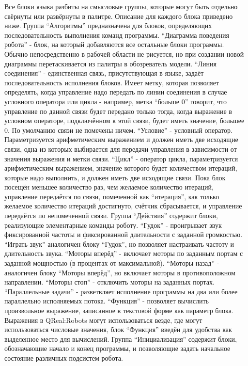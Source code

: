 	Все блоки языка разбиты на смысловые группы, которые могут быть отдельно свёрнуты или развёрнуты в палитре. Описание для каждого блока приведено ниже.
Группа “Алгоритмы” предназначена для блоков, определяющих последовательность выполнения команд программы.
“Диаграмма поведения робота” - блок, на который добавляются все остальные блоки программы. Обычно непосредственно в рабочей области не рисуется, но при создании новой диаграммы перетаскивается из палитры в обозреватель модели.
“Линия соединения” - единственная связь, присутствующая в языке, задаёт последовательность исполнения блоков. Имеет метку, которая позволяет определять, когда управление надо передать по линии соединения в случае условного оператора или цикла - например, метка “больше 0” говорит, что управление по данной связи будет передано только тогда, когда выражение в условном операторе, подключённом к этой связи, будет иметь значение, большее 0. По умолчанию связи не помечены ничем.
“Условие” - условный оператор. Параметризуется арифметическим выражением и должен иметь две исходящие связи, одна из которых выбирается для передачи управления в зависимости от значения выражения и метки связи.
“Цикл” - оператор цикла, параметризуется арифметическим выражением, значение которого будет количеством итераций, которые надо выполнить, и должен иметь две исходящие связи. Пока блок посещён меньшее количество раз, чем желаемое количество итераций, управление передаётся по связи, помеченной как “итерация”, как только желаемое количество итераций достигнуто, счётчик сбрасывается, и управление передаётся по непомеченной связи.
Группа “Действия” содержит блоки, реализующие элементарные команды роботу.
“Гудок” - проигрывает звук фиксированной частоты и фиксированной длительности с заданной громкостью.
“Играть звук” аналогичен блоку “Гудок”, но позволяет настраивать частоту и длительность звука.
“Моторы вперёд” - включает моторы по заданным портам с заданной мощностью (в процентах от максимальной).
“Моторы назад” - аналогичен блоку “Моторы вперёд”, но включает моторы в противоположном направлении.
“Моторы стоп”  - отключить моторы на заданных портах.
“Параллельные задачи” - разветвляет исполнение программы на два или более параллельно исполняемых потока.
“Функция” - позволяет вычислить произвольное выражение, записанное в текстовой форме как параметр блока. Выражения в QReal:Robots могут использоваться везде, где могут использоваться числовые значения, блок “Функция” введён для удобства как выделенное место для вычислений.
Группа “Инициализация” содержит блоки, обозначающие начало и конец программы, и позволяющие задать начальное состояние различных подсистем робота.
